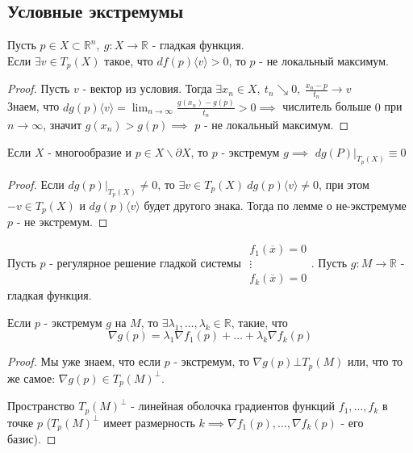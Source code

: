 \subsection{Условные экстремумы}

\begin{lemma*}[о не-максимуме]
    Пусть $p \in X \subset \mathbb{R}^n, \ g:X \to \mathbb{R}$ - гладкая функция.\\
    Если $\exists v \in T_p(X)$ такое, что $df(p)\langle v \rangle > 0$, то $p$ - не локальный максимум.

    \begin{proof}
        Пусть $v$ - вектор из условия. Тогда $\exists x_n \in X,\ t_n \searrow 0,\ \frac{x_n - p}{t_n} \to v$\\
        Знаем, что $dg(p)\langle v \rangle = \lim_{n \to \infty }\frac{g(x_n) - g(p)}{t_n} > 0 \implies$ числитель больше $0$ при $n \to \infty$, значит $g(x_n) > g(p) \implies$ $p$ - не локальный максимум.
    \end{proof}
\end{lemma*}

\begin{statement*}[Следствие]
    Если $X$ - многообразие и $p \in X \backslash \partial X$, то $p$ - экстремум $g \implies$ $dg(P)|_{T_p(X)} \equiv 0$

    \begin{proof}
        Если $dg(p)|_{T_p(X)} \neq 0$, то $\exists v \in T_p(X) \ dg(p)\langle v \rangle \neq 0$, 
        при этом $-v \in T_p(X)$ и $dg(p)\langle v \rangle$ будет другого знака. Тогда по лемме о не-экстремуме $p$ - не экстремум.
    \end{proof}
\end{statement*}


\begin{theorem}[о градиентах]
    Пусть $p$ - регулярное решение гладкой системы $\begin{array}{c} f_1(\overline{x}) = 0 \\ \vdots \\ f_k(\overline{x}) = 0 \end{array}$. Пусть $g: M \to \mathbb{R}$ - гладкая функция.  \par
    Если $p$ - экстремум $g$ на $M$, то $\exists \lambda_1, \hdots, \lambda_k \in \mathbb{R}$, такие, что
    \[\nabla g(p) = \lambda_1\nabla f_1(p) + \hdots + \lambda_k \nabla f_k(p)\]
    \begin{proof}
        Мы уже знаем, что если $p$ - экстремум, то $\nabla g(p) \bot T_p(M)$ или, что то же самое: $\nabla g(p) \in T_p(M)^{\bot}$. \par
        Пространство $T_p(M)^{\bot}$ - линейная оболочка градиентов функций $f_1, \hdots, f_k$ в точке $p$  ($T_p(M)^{\bot}$ имеет размерность $k \implies \nabla f_1(p), \hdots, \nabla f_k(p)$ - его базис). 
    \end{proof}
\end{theorem}